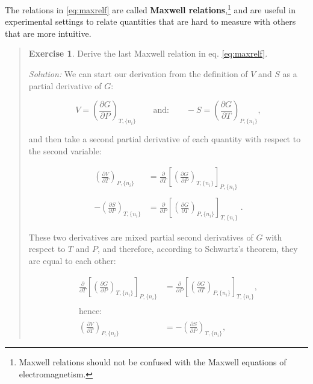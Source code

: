 \documentclass[
  9pt,
]{extbook}
\theoremstyle{definition}
\theoremstyle{definition}
\theoremstyle{definition}
\newtheorem{exercise}{Exercise}[chapter]
\theoremstyle{definition}
\theoremstyle{remark}
\begin{document}
The relations in \eqref{eq:maxrelf} are called \textbf{Maxwell relations},\footnote{Maxwell relations should not be confused with the Maxwell equations of electromagnetism.} and are useful in experimental settings to relate quantities that are hard to measure with others that are more intuitive.

\begin{quote}
\begin{exercise}
\protect\hypertarget{exr:maxwellEx}{}\label{exr:maxwellEx}Derive the last Maxwell relation in eq. \eqref{eq:maxrelf}.

\emph{Solution:} We can start our derivation from the definition of \(V\) and \(S\) as a partial derivative of \(G\):

\begin{equation}
 V = \left(\frac{\partial G}{\partial P} \right)_{T,\{n_i\}} \qquad \text{and:} \qquad -S = \left(\frac{\partial G}{\partial T} \right)_{P,\{n_i\}},
\end{equation}

and then take a second partial derivative of each quantity with respect to the second variable:

\begin{equation}
\begin{aligned}
 \left(\frac{\partial V}{\partial T} \right)_{P,\{n_i\}} &=\frac{\partial}{\partial T}\left[ \left(\frac{\partial G}{\partial P} \right)_{T,\{n_i\}} \right]_{P,\{n_i\}} \\
\\
-\left(\frac{\partial S}{\partial P} \right)_{T,\{n_i\}} &=\frac{\partial}{\partial P}\left[ \left(\frac{\partial G}{\partial T} \right)_{P,\{n_i\}} \right]_{T,\{n_i\}} \;.
\end{aligned}
\end{equation}

These two derivatives are mixed partial second derivatives of \(G\) with respect to \(T\) and \(P\), and therefore, according to Schwartz's theorem, they are equal to each other:

\begin{equation}
\begin{aligned}
\frac{\partial}{\partial T}\left[ \left(\frac{\partial G}{\partial P} \right)_{T,\{n_i\}} \right]_{P,\{n_i\}} &=
\frac{\partial}{\partial P}\left[ \left(\frac{\partial G}{\partial T} \right)_{P,\{n_i\}} \right]_{T,\{n_i\}}, \\
\\
\text{hence:} \\
\\
 \left(\frac{\partial V}{\partial T} \right)_{P,\{n_i\}} &= -\left(\frac{\partial S}{\partial P} \right)_{T,\{n_i\}},
\end{aligned}
\end{equation}


\end{exercise}
\end{quote}
\end{document}
